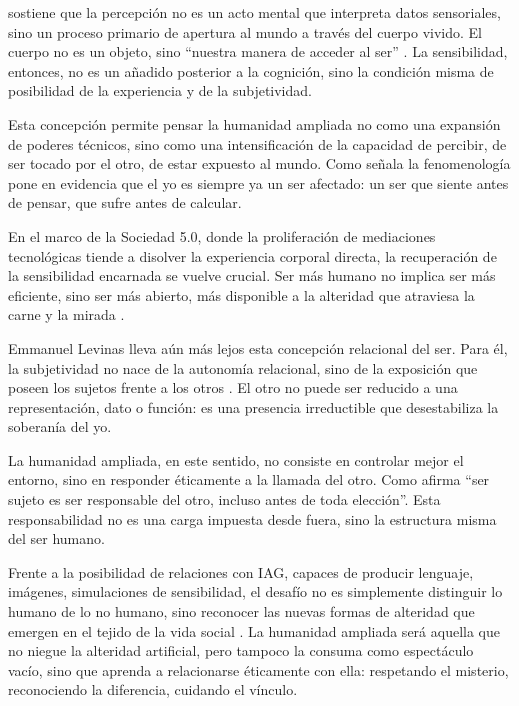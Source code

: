 \documentclass[spanish]{textolivre}
\begin{document}
\textcite{merleauponty2009} sostiene que la percepción no es un acto mental que interpreta datos sensoriales, sino un proceso primario de apertura al mundo a través del cuerpo vivido. El cuerpo no es un objeto, sino “nuestra manera de acceder al ser” \cite[p. 203]{merleauponty2009}. La sensibilidad, entonces, no es un añadido posterior a la cognición, sino la condición misma de posibilidad de la experiencia y de la subjetividad.

Esta concepción permite pensar la humanidad ampliada no como una expansión de poderes técnicos, sino como una intensificación de la capacidad de percibir, de ser tocado por el otro, de estar expuesto al mundo. Como señala \textcite{zahavi2019phenomenology} la fenomenología pone en evidencia que el yo es siempre ya un ser afectado: un ser que siente antes de pensar, que sufre antes de calcular. 

En el marco de la Sociedad 5.0, donde la proliferación de mediaciones tecnológicas tiende a disolver la experiencia corporal directa, la recuperación de la sensibilidad encarnada se vuelve crucial. Ser más humano no implica ser más eficiente, sino ser más abierto, más disponible a la alteridad que atraviesa la carne y la mirada \cite{seguelotondo2024}.

Emmanuel Levinas lleva aún más lejos esta concepción relacional del ser. Para él, la subjetividad no nace de la autonomía relacional, sino de la exposición que poseen los sujetos frente a los otros \cite{levinas2006}. El otro no puede ser reducido a una representación, dato o función: es una presencia irreductible que desestabiliza la soberanía del yo.

La humanidad ampliada, en este sentido, no consiste en controlar mejor el entorno, sino en responder éticamente a la llamada del otro. Como afirma \textcite[p. 102]{levinas2006} “ser sujeto es ser responsable del otro, incluso antes de toda elección”. Esta responsabilidad no es una carga impuesta desde fuera, sino la estructura misma del ser humano.

Frente a la posibilidad de relaciones con IAG, capaces de producir lenguaje, imágenes, simulaciones de sensibilidad, el desafío no es simplemente distinguir lo humano de lo no humano, sino reconocer las nuevas formas de alteridad que emergen en el tejido de la vida social \cite{seguelotondo2024}. La humanidad ampliada será aquella que no niegue la alteridad artificial, pero tampoco la consuma como espectáculo vacío, sino que aprenda a relacionarse éticamente con ella: respetando el misterio, reconociendo la diferencia, cuidando el vínculo. 
\end{document}
